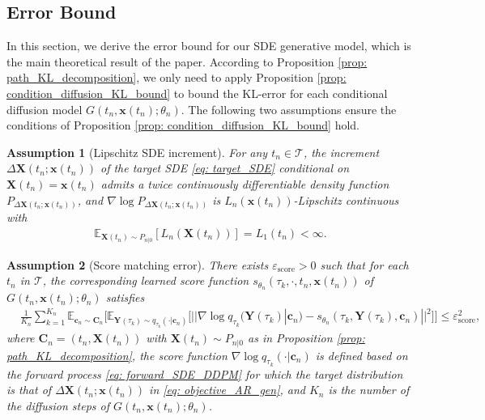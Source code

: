 \documentclass[11pt]{article}
\newtheorem{assumption}{Assumption}
\newcommand{\mE}{\mathbb{E}}
\newcommand{\bX}{\mathbf{X}}
\newcommand{\bY}{\mathbf{Y}}
\newcommand{\bx}{\mathbf{x}}
\newcommand{\bc}{\mathbf{c}}
\newcommand{\bC}{\mathbf{C}}
\begin{document}
\subsection{Error Bound}\label{sec:bound-SDE}
In this section, we derive the error bound for our SDE generative model, which is the main theoretical result of the paper.
According to Proposition \ref{prop: path_KL_decomposition}, we only need to apply Proposition \ref{prop: condition_diffusion_KL_bound} to bound the KL-error for each conditional diffusion model $G(t_n, \bx(t_n); \theta_n)$. The following two assumptions ensure the conditions of Proposition \ref{prop: condition_diffusion_KL_bound} hold.




\begin{assumption}[Lipschitz SDE increment]\label{assumption: SDE_increment_Lipschitz}
    For any $t_n\in\mathcal{T}$, the increment $\Delta\bX(t_n; \bx(t_n))$ of the target SDE \eqref{eq: target_SDE} conditional on $\bX(t_n) = \bx(t_n)$ admits a twice continuously differentiable density function $P_{\Delta\bX(t_n; \bx(t_n))}$, and $\nabla\log P_{\Delta\bX(t_n; \bx(t_n))}$ is $L_n(\bx(t_n))$-Lipschitz continuous with 
\begin{align*}
    \mE_{\bX(t_n)\sim P_{n|0}}[L_n(\bX(t_n))] = L_1(t_n) < \infty.
\end{align*}
\end{assumption}

\begin{assumption}[Score matching error]\label{assumption: score_matching_error}
    There exists $\varepsilon_{\text{score}} > 0$ such that for each $t_n$ in $\mathcal{T}$, the corresponding learned score function $s_{\theta_n}(\tau_k, \cdot, t_n, \bx(t_n))$ of $G(t_n, \bx(t_n); \theta_n)$ satisfies
    \begin{align*}
       &\frac{1}{K_n}\sum_{k=1}^{K_n}\mE_{\bc_n\sim\bC_n}\bigg[\mE_{\bY(\tau_k)\sim q_{\tau_k}(\cdot | \bc_n)}\big[||\nabla\log q_{\tau_k}(\bY(\tau_k) | \bc_n) - s_{\theta_n}(\tau_k, \bY(\tau_k), \bc_n)||^2\big]\bigg]\le \varepsilon^2_{\text{score}},
    \end{align*}
    where $\bC_n = (t_n, \bX(t_n))$ with $\bX(t_n)\sim P_{n|0}$ as in Proposition \ref{prop: path_KL_decomposition}, the score function $\nabla\log q_{\tau_k}(\cdot | \bc_n)$ is defined based on the forward process \eqref{eq: forward_SDE_DDPM} for which the target distribution is that of $\Delta\bX(t_n; \bx(t_n))$ in \eqref{eq: objective_AR_gen}, and $K_n$ is the number of the diffusion steps of $G(t_n, \bx(t_n); \theta_n)$.
\end{assumption}
\end{document}
